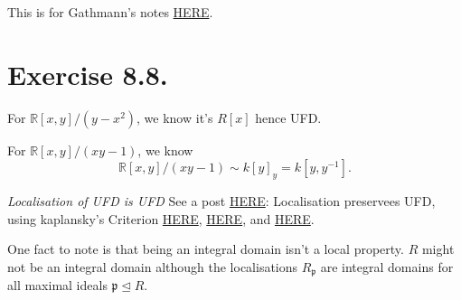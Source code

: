 This is for Gathmann's notes \href{https://agag-gathmann.math.rptu.de/en/commalg.php}{HERE}.

\section{Exercise 8.8.}

For $\mathbb R[x,y]/(y-x^2)$, we know it's $R[x]$ hence UFD.

For $\mathbb R[x,y]/(xy-1)$, we know 
\[\mathbb R[x,y]/(xy-1)\sim k[y]_y=k[y,y^{-1}].\]

\textit{Localisation of UFD is UFD}
See a post \href{https://math.stackexchange.com/questions/2066749/localization-preserves-ufds-using-kaplansky-criterion}{HERE}: Localisation preservees UFD, using kaplansky's Criterion \href{https://public.websites.umich.edu/~brgould/disc4.pdf}{HERE}, \href{http://alpha.math.uga.edu/%7Epete/integral.pdf}{HERE}, and \href{https://math.stackexchange.com/questions/140584/about-the-localization-of-a-ufd/140596#140596}{HERE}.

One fact to note is that being an integral domain isn't a local property. $R$ might not be an integral domain although the localisations $R_{\mathfrak p}$ are integral domains for all maximal ideals $\mathfrak p\trianglelefteq R$.
